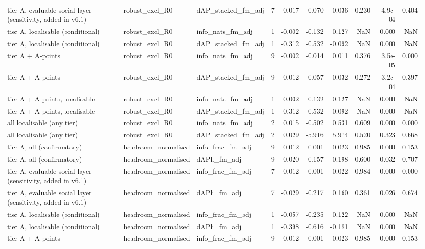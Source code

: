 \begin{tabular}{lllrrrrrrr}
tier A, evaluable social layer (sensitivity, added in v6.1) & robust\_excl\_R0 & dAP\_stacked\_fm\_adj & 7 & -0.017 & -0.070 & 0.036 & 0.230 & 4.9e-04 & 0.404 \\
tier A, localisable (conditional) & robust\_excl\_R0 & info\_nats\_fm\_adj & 1 & -0.002 & -0.132 & 0.127 & NaN & 0.000 & NaN \\
tier A, localisable (conditional) & robust\_excl\_R0 & dAP\_stacked\_fm\_adj & 1 & -0.312 & -0.532 & -0.092 & NaN & 0.000 & NaN \\
tier A + A-points & robust\_excl\_R0 & info\_nats\_fm\_adj & 9 & -0.002 & -0.014 & 0.011 & 0.376 & 3.5e-05 & 0.000 \\
tier A + A-points & robust\_excl\_R0 & dAP\_stacked\_fm\_adj & 9 & -0.012 & -0.057 & 0.032 & 0.272 & 3.2e-04 & 0.397 \\
tier A + A-points, localisable & robust\_excl\_R0 & info\_nats\_fm\_adj & 1 & -0.002 & -0.132 & 0.127 & NaN & 0.000 & NaN \\
tier A + A-points, localisable & robust\_excl\_R0 & dAP\_stacked\_fm\_adj & 1 & -0.312 & -0.532 & -0.092 & NaN & 0.000 & NaN \\
all localisable (any tier) & robust\_excl\_R0 & info\_nats\_fm\_adj & 2 & 0.015 & -0.502 & 0.531 & 0.609 & 0.000 & 0.000 \\
all localisable (any tier) & robust\_excl\_R0 & dAP\_stacked\_fm\_adj & 2 & 0.029 & -5.916 & 5.974 & 0.520 & 0.323 & 0.668 \\
tier A, all (confirmatory) & headroom\_normalised & info\_frac\_fm\_adj & 9 & 0.012 & 0.001 & 0.023 & 0.985 & 0.000 & 0.153 \\
tier A, all (confirmatory) & headroom\_normalised & dAPh\_fm\_adj & 9 & 0.020 & -0.157 & 0.198 & 0.600 & 0.032 & 0.707 \\
tier A, evaluable social layer (sensitivity, added in v6.1) & headroom\_normalised & info\_frac\_fm\_adj & 7 & 0.012 & 0.001 & 0.022 & 0.984 & 0.000 & 0.000 \\
tier A, evaluable social layer (sensitivity, added in v6.1) & headroom\_normalised & dAPh\_fm\_adj & 7 & -0.029 & -0.217 & 0.160 & 0.361 & 0.026 & 0.674 \\
tier A, localisable (conditional) & headroom\_normalised & info\_frac\_fm\_adj & 1 & -0.057 & -0.235 & 0.122 & NaN & 0.000 & NaN \\
tier A, localisable (conditional) & headroom\_normalised & dAPh\_fm\_adj & 1 & -0.398 & -0.616 & -0.181 & NaN & 0.000 & NaN \\
tier A + A-points & headroom\_normalised & info\_frac\_fm\_adj & 9 & 0.012 & 0.001 & 0.023 & 0.985 & 0.000 & 0.153 \\

\end{tabular}
